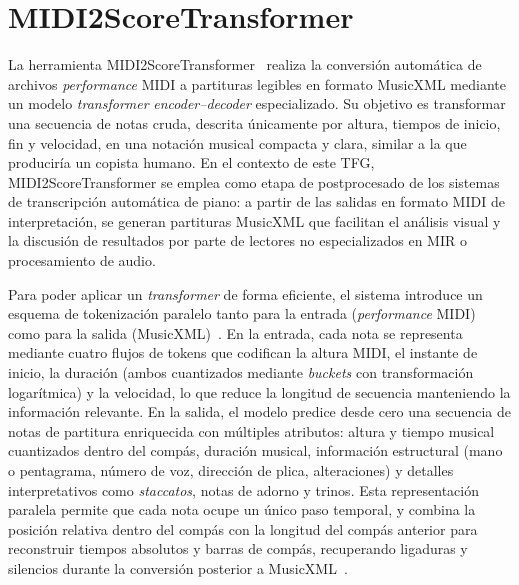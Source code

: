 \documentclass[11pt,spanish,listoffigures,listoftables]{tfgetsinf}
\begin{document}
\section{MIDI2ScoreTransformer}
\label{sec:midi2scoretransformer}
La herramienta MIDI2ScoreTransformer~\cite{beyer2024midi2score} realiza la conversión automática de archivos \emph{performance} MIDI a partituras legibles
en formato MusicXML mediante un modelo \textit{transformer} \emph{encoder--decoder} especializado. Su objetivo es transformar una secuencia de
notas cruda, descrita únicamente por altura, tiempos de inicio, fin y velocidad, en una notación musical compacta y clara, similar a
la que produciría un copista humano. En el contexto de este TFG, MIDI2ScoreTransformer se emplea como etapa de postprocesado de
los sistemas de transcripción automática de piano: a partir de las salidas en formato MIDI de interpretación, se generan partituras MusicXML
que facilitan el análisis visual y la discusión de resultados por parte de lectores no especializados en MIR o procesamiento de audio.

Para poder aplicar un \textit{transformer} de forma eficiente, el sistema introduce un esquema de tokenización paralelo tanto para la entrada
(\textit{performance} MIDI) como para la salida (MusicXML)~\cite{beyer2024midi2score}. En la entrada, cada nota se representa mediante cuatro flujos de tokens que codifican
la altura MIDI, el instante de inicio, la duración (ambos cuantizados mediante \emph{buckets} con transformación logarítmica) y la velocidad,
lo que reduce la longitud de secuencia manteniendo la información relevante. En la salida, el modelo predice desde cero una secuencia de notas
de partitura enriquecida con múltiples atributos: altura y tiempo musical cuantizados dentro del compás, duración musical, información
estructural (mano o pentagrama, número de voz, dirección de plica, alteraciones) y detalles interpretativos como \textit{staccatos}, notas de adorno
y trinos. Esta representación paralela permite que cada nota ocupe un único paso temporal, y combina la posición relativa dentro del compás
con la longitud del compás anterior para reconstruir tiempos absolutos y barras de compás, recuperando ligaduras y silencios durante la
conversión posterior a MusicXML~\cite{beyer2024midi2score}.
\end{document}
